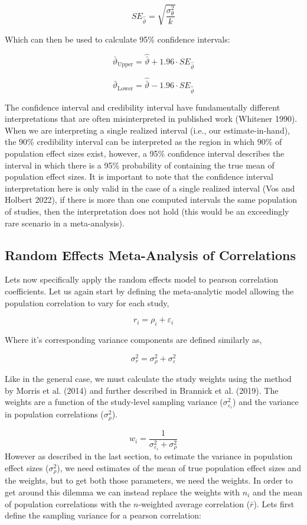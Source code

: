 \documentclass[
  letterpaper,
  DIV=11,
  numbers=noendperiod]{scrreprt}
\begin{document}
\[
SE_\hat{\bar{\vartheta}} = \sqrt{\frac{\sigma^2_\theta}{k}}
\]

Which can then be used to calculate 95\% confidence intervals:

\[
\bar{\vartheta}_\text{Upper} = \hat{\bar{\vartheta}} + 1.96\cdot SE_\hat{\bar{\vartheta}}
\]

\[
\bar{\vartheta}_\text{Lower} = \hat{\bar{\vartheta}} - 1.96\cdot SE_\hat{\bar{\vartheta}}
\]

The confidence interval and credibility interval have fundamentally
different interpretations that are often misinterpreted in published
work (Whitener 1990). When we are interpreting a single realized
interval (i.e., our estimate-in-hand), the 90\% credibility interval can
be interpreted as the region in which 90\% of population effect sizes
exist, however, a 95\% confidence interval describes the interval in
which there is a 95\% probability of containing the true mean of
population effect sizes. It is important to note that the confidence
interval interpretation here is only valid in the case of a single
realized interval (Vos and Holbert 2022), if there is more than one
computed intervals the same population of studies, then the
interpretation does not hold (this would be an exceedingly rare scenario
in a meta-analysis).

\hypertarget{sec-random-corr}{%
\subsection{Random Effects Meta-Analysis of
Correlations}\label{sec-random-corr}}

Lets now specifically apply the random effects model to pearson
correlation coefficients. Let us again start by defining the
meta-analytic model allowing the population correlation to vary for each
study,

\[
r_i = \rho_i + \varepsilon_i
\]

Where it's corresponding variance components are defined similarly as,

\[
\sigma^2_r = \sigma^2_\rho + \sigma^2_\varepsilon
\]

Like in the general case, we must calculate the study weights using the
method by Morris et al. (2014) and further described in Brannick et al.
(2019). The weights are a function of the study-level sampling variance
(\(\sigma^2_{\varepsilon_i}\)) and the variance in population
correlations (\(\sigma^2_{\rho}\)).

\[
w_i = \frac{1}{\sigma^2_{\varepsilon_i}+\sigma^2_{\rho}}
\] However as described in the last section, to estimate the variance in
population effect sizes (\(\sigma^2_{\rho}\)), we need estimates of the
mean of true population effect sizes and the weights, but to get both
those parameters, we need the weights. In order to get around this
dilemma we can instead replace the weights with \(n_i\) and the mean of
population correlations with the \(n\)-weighted average correlation
(\(\bar{r}\)). Lets first define the sampling variance for a pearson
correlation:
\end{document}
